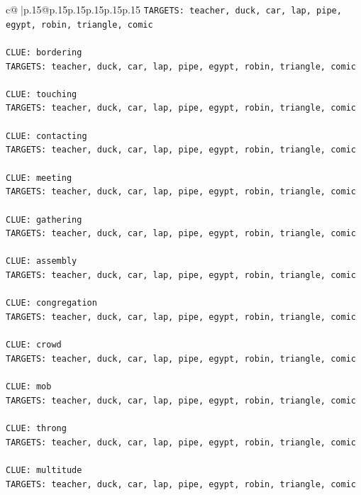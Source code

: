 \documentclass{article}
\begin{document}
{\begin{supertabular}{c@{$\;$}|p{.15\linewidth}@{}p{.15\linewidth}p{.15\linewidth}p{.15\linewidth}p{.15\linewidth}p{.15\linewidth}}
{{{\texttt{TARGETS: teacher, duck, car, lap, pipe, egypt, robin, triangle, comic} \\
\\ 
\texttt{CLUE: bordering} \\
\texttt{TARGETS: teacher, duck, car, lap, pipe, egypt, robin, triangle, comic} \\
\\ 
\texttt{CLUE: touching} \\
\texttt{TARGETS: teacher, duck, car, lap, pipe, egypt, robin, triangle, comic} \\
\\ 
\texttt{CLUE: contacting} \\
\texttt{TARGETS: teacher, duck, car, lap, pipe, egypt, robin, triangle, comic} \\
\\ 
\texttt{CLUE: meeting} \\
\texttt{TARGETS: teacher, duck, car, lap, pipe, egypt, robin, triangle, comic} \\
\\ 
\texttt{CLUE: gathering} \\
\texttt{TARGETS: teacher, duck, car, lap, pipe, egypt, robin, triangle, comic} \\
\\ 
\texttt{CLUE: assembly} \\
\texttt{TARGETS: teacher, duck, car, lap, pipe, egypt, robin, triangle, comic} \\
\\ 
\texttt{CLUE: congregation} \\
\texttt{TARGETS: teacher, duck, car, lap, pipe, egypt, robin, triangle, comic} \\
\\ 
\texttt{CLUE: crowd} \\
\texttt{TARGETS: teacher, duck, car, lap, pipe, egypt, robin, triangle, comic} \\
\\ 
\texttt{CLUE: mob} \\
\texttt{TARGETS: teacher, duck, car, lap, pipe, egypt, robin, triangle, comic} \\
\\ 
\texttt{CLUE: throng} \\
\texttt{TARGETS: teacher, duck, car, lap, pipe, egypt, robin, triangle, comic} \\
\\ 
\texttt{CLUE: multitude} \\
\texttt{TARGETS: teacher, duck, car, lap, pipe, egypt, robin, triangle, comic} \\
}}}
\end{supertabular}}
\end{document}
